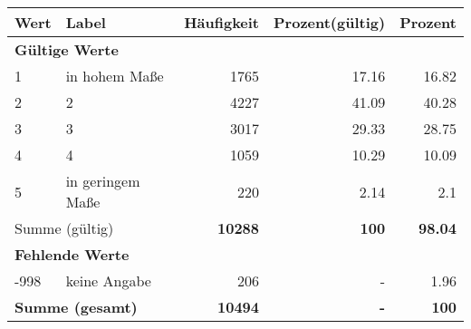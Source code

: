     \begin{longtable}{lXrrr}
     \toprule
     \textbf{Wert} & \textbf{Label} & \textbf{Häufigkeit} & \textbf{Prozent(gültig)} & \textbf{Prozent} \\
     \endhead
     \midrule
     \multicolumn{5}{l}{\textbf{Gültige Werte}}\\

     1 &
     \multicolumn{1}{X}{ in hohem Maße   } &


       \num{1765} &
       \num[round-mode=places,round-precision=2]{17,16} &
         \num[round-mode=places,round-precision=2]{16,82} \\

     2 &
     \multicolumn{1}{X}{ 2   } &


       \num{4227} &
       \num[round-mode=places,round-precision=2]{41,09} &
         \num[round-mode=places,round-precision=2]{40,28} \\

     3 &
     \multicolumn{1}{X}{ 3   } &


       \num{3017} &
       \num[round-mode=places,round-precision=2]{29,33} &
         \num[round-mode=places,round-precision=2]{28,75} \\

     4 &
     \multicolumn{1}{X}{ 4   } &


       \num{1059} &
       \num[round-mode=places,round-precision=2]{10,29} &
         \num[round-mode=places,round-precision=2]{10,09} \\

     5 &
     \multicolumn{1}{X}{ in geringem Maße   } &


       \num{220} &
       \num[round-mode=places,round-precision=2]{2,14} &
         \num[round-mode=places,round-precision=2]{2,1} \\
     \midrule
     \multicolumn{2}{l}{Summe (gültig)} &
       \textbf{\num{10288}} &
     \textbf{100} &
       \textbf{\num[round-mode=places,round-precision=2]{98,04}} \\
     \multicolumn{5}{l}{\textbf{Fehlende Werte}}\\
       -998 &
       keine Angabe &
         \num{206} &
        - &
         \num[round-mode=places,round-precision=2]{1,96} \\
     \midrule
     \multicolumn{2}{l}{\textbf{Summe (gesamt)}} &
          \textbf{\num{10494}} &
        \textbf{-} &
        \textbf{100} \\
     \bottomrule
     \end{longtable}
     
